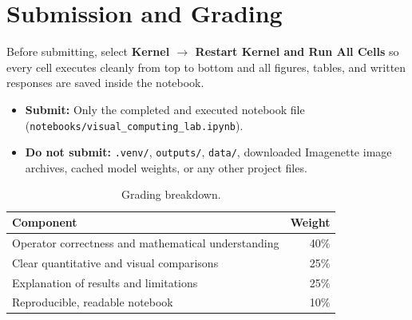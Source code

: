 \documentclass[11pt,letterpaper]{article}
\newcommand{\code}[1]{\texttt{\textcolor{primary}{#1}}}
\begin{document}
\section{Submission and Grading}

Before submitting, select \textbf{Kernel $\to$ Restart Kernel and Run All Cells} so every cell executes cleanly from top to bottom and all figures, tables, and written responses are saved inside the notebook.
\begin{itemize}
  \item \textbf{Submit:} Only the completed and executed notebook file (\code{notebooks/visual\_computing\_lab.ipynb}).
  \item \textbf{Do not submit:} \code{.venv/}, \code{outputs/}, \code{data/}, downloaded Imagenette image archives, cached model weights, or any other project files.
\end{itemize}

\begin{table}[H]
  \centering\small
  \setlength{\aboverulesep}{0pt}
  \setlength{\belowrulesep}{0pt}
  \renewcommand{\arraystretch}{1.35}
  \begin{tabular}{lr}
    \toprule
    \rowcolor{bannerbg}
    \textbf{\color{primary}Component}                   & \textbf{\color{primary}Weight} \\
    \midrule
    Operator correctness and mathematical understanding & 40\%                           \\
    Clear quantitative and visual comparisons           & 25\%                           \\
    Explanation of results and limitations              & 25\%                           \\
    Reproducible, readable notebook                     & 10\%                           \\
    \bottomrule
  \end{tabular}
  \caption{Grading breakdown.}
\end{table}
\end{document}
